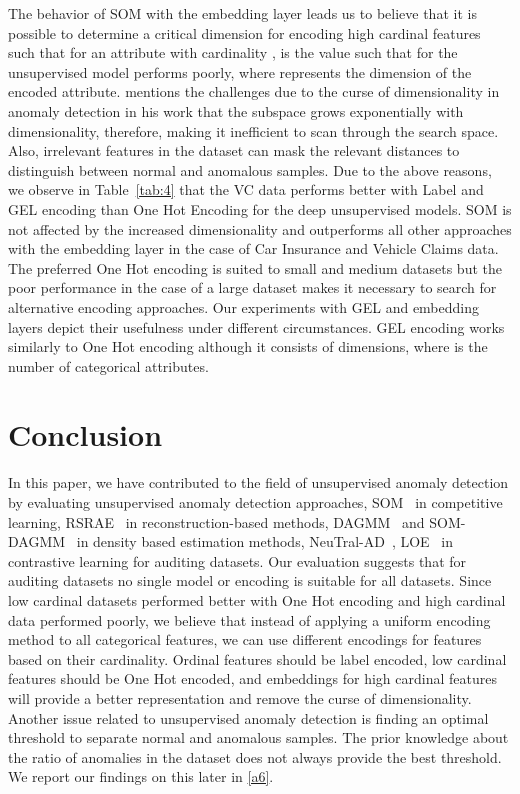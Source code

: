 \documentclass{article}
\begin{document}
The behavior of SOM with the embedding layer leads us to believe that it is possible to determine a critical dimension  for encoding high cardinal features such that for an attribute with cardinality ,  is the value such that for  the unsupervised model performs poorly, where  represents the dimension of the encoded attribute. \citep{zimek} mentions the challenges due to the curse of dimensionality in anomaly detection in his work that the subspace grows exponentially with dimensionality, therefore, making it inefficient to scan through the search space. Also, irrelevant features in the dataset can mask the relevant distances to distinguish between normal and anomalous samples. Due to the above reasons, we observe in Table~\ref{tab:4} that the VC data performs better with Label and GEL encoding than One Hot Encoding for the deep unsupervised models. SOM is not affected by the increased dimensionality and outperforms all other approaches with the embedding layer in the case of Car Insurance and Vehicle Claims data. The preferred One Hot encoding is suited to small and medium datasets but the poor performance in the case of a large dataset makes it necessary to search for alternative encoding approaches. Our experiments with GEL and embedding layers depict their usefulness under different circumstances. GEL encoding works similarly to One Hot encoding although it consists of  dimensions, where  is the number of categorical attributes.

\section{Conclusion}
In this paper, we have contributed to the field of unsupervised anomaly detection by evaluating unsupervised anomaly detection approaches, SOM~\citep{som} in competitive learning, RSRAE~\citep{rsrae} in reconstruction-based methods, DAGMM~\citep{dagmm} and SOM-DAGMM~\citep{som} in density based estimation methods, NeuTral-AD~\citep{qiu2021neural}, LOE~\citep{qiu2022latent} in contrastive learning for auditing datasets. Our evaluation suggests that for auditing datasets no single model or encoding is suitable for all  datasets. Since low cardinal datasets performed better with One Hot encoding and high cardinal data performed poorly, we believe that instead of applying a uniform encoding method to all categorical features, we can use different encodings for features based on their cardinality. Ordinal features should be label encoded, low cardinal features should be One Hot encoded, and embeddings for high cardinal features will provide a better representation and remove the curse of dimensionality.
Another issue related to unsupervised anomaly detection is finding an optimal threshold to separate normal and anomalous samples. The prior knowledge about the ratio of anomalies in the dataset does not always provide the best threshold. We report our findings on this later in \ref{a6}. 
\end{document}
